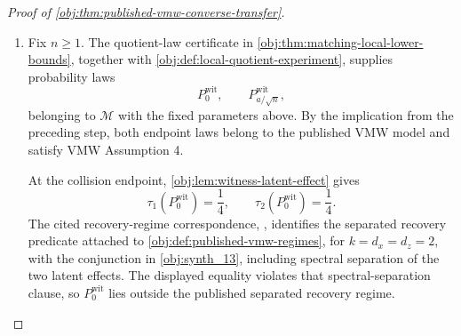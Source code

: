 \begin{proof}[Proof of \cref{obj:thm:published-vmw-converse-transfer}]
\begin{enumerate}
It remains to verify VMW Assumption 4 in \cref{obj:synth_18}.  Put
\[
M_{\mathrm{stack}}:=\operatorname{stack}(M_0(P),M_1(P)).
\]
Choose a singular-value decomposition
\[
M_{\mathrm{stack}}=\sum_j s_j\ell_j r_j^\top,
\qquad
s_1\ge s_2\ge\cdots .
\]
By \cref{obj:prop:observed-vmw-margin-inclusion},
\[
s_2(M_{\mathrm{stack}})=\sigma_2(M_{\mathrm{stack}})
\ge \pi_0\sigma_0^2=\frac1{1000}>0.
\]
Let \(V=(r_1,r_2)\).  Then the columns of \(V\) are orthonormal and satisfy
\[
M_{\mathrm{stack}}^\top M_{\mathrm{stack}}r_j=s_j^2r_j,
\qquad j=1,2,
\]
so \(V\) is a population top-two right singular basis.  Since \(s_j>0\),
\[
r_j=s_j^{-1}M_{\mathrm{stack}}^\top\ell_j,
\qquad j=1,2.
\]
For \(y=(y_0,y_1)\in\mathbb R^{d_z}\oplus\mathbb R^{d_z}\),
\[
M_{\mathrm{stack}}^\top y=M_0(P)^\top y_0+M_1(P)^\top y_1.
\]
Hence each \(r_j\) lies in the signal space generated by the two armwise row spaces.  The factorization in \cref{obj:prop:observed-vmw-margin-inclusion} gives rank at most \(2\) for this signal space, while \(s_2(M_{\mathrm{stack}})>0\) gives rank at least \(2\).  Therefore the span of \(V\) is exactly the signal space.  Applying the compressed-margin conclusion of \cref{obj:prop:observed-vmw-margin-inclusion} to this basis gives
\[
\sigma_2\{M_t(P)V\}\ge \pi_0\sigma_0^2=\frac1{1000},
\qquad t\in\{0,1\}.
\]
Together with
\[
\|X\|_2\le2,\qquad
\|ZX^\top\|_{\mathrm{op}}\le2,\qquad
\|YZX^\top\|_{\mathrm{op}}\le2,
\qquad
P(T=t)\ge2\pi_0=\frac15,
\]
these are the finite envelope, treatment-arm, top-right-basis, stacked-margin, and compressed-margin clauses of \cref{obj:synth_18}, with
\[
L_X=L_{ZX}=L_{YZX}=2,
\qquad
\pi=\frac15,
\qquad
\sigma=\frac1{1000}.
\]
Thus every such \(P\in\mathcal M\) satisfies VMW Assumption 4. %

\item Fix \(n\ge1\).  The quotient-law certificate in \cref{obj:thm:matching-local-lower-bounds}, together with \cref{obj:def:local-quotient-experiment}, supplies probability laws
\[
P_0^{\mathrm{wit}},
\qquad
P_{a/\sqrt n}^{\mathrm{wit}},
\]
belonging to \(\mathcal M\) with the fixed parameters above.  By the implication from the preceding step, both endpoint laws belong to the published VMW model and satisfy VMW Assumption 4.

At the collision endpoint, \cref{obj:lem:witness-latent-effect} gives
\[
\tau_1(P_0^{\mathrm{wit}})=\frac14,
\qquad
\tau_2(P_0^{\mathrm{wit}})=\frac14.
\]
The cited recovery-regime correspondence, \citep[Assumption 3, lines 261--263; Assumption 4, lines 321--337; and Theorem 7.2, lines 350--381]{VirkMazaheriWu2026}, identifies the separated recovery predicate attached to \cref{obj:def:published-vmw-regimes}, for \(k=d_x=d_z=2\), with the conjunction in \cref{obj:synth_13}, including spectral separation of the two latent effects.  The displayed equality violates that spectral-separation clause, so \(P_0^{\mathrm{wit}}\) lies outside the published separated recovery regime. %


\end{enumerate}
\end{proof}
